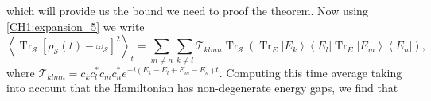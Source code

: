 which will provide us the bound we need to proof the theorem. Now using \eqref{CH1:expansion_5} we write
\begin{equation}
\left\langle\operatorname{Tr}_{\mathcal{S}}\left[\rho_{\mathcal{S}}(t)-\omega_{\mathcal{S}}\right]^{2}\right\rangle_{t}=\sum_{m \neq n} \sum_{k \neq l} \mathcal{T}_{k l m n} \operatorname{Tr}_{\mathcal{S}}\left(\operatorname{Tr}_{E}\left|E_{k}\right\rangle\left\langle E_{l}\left|\operatorname{Tr}_{E}\right| E_{m}\right\rangle\left\langle E_{n}\right|\right),
\end{equation}
where $\mathcal{T}_{k l m n}=c_{k} c_{l}^{*} c_{m} c_{n}^{*} e^{-i\left(E_{k}-E_{l}+E_{m}-E_{n}\right) t}$. Computing this time average taking into account that the Hamiltonian has non-degenerate energy gaps, we find  that

